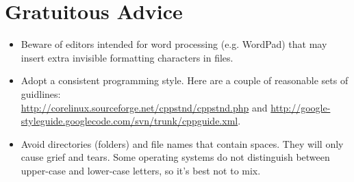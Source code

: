 \section{Gratuitous Advice}
\begin{itemize}
\item Beware of editors intended for word processing (e.g. WordPad)
that may insert extra invisible formatting characters in files.
\item Adopt a consistent programming style. Here are a couple of
reasonable sets of guidlines:\\
\url{http://corelinux.sourceforge.net/cppstnd/cppstnd.php}
and
\url{http://google-styleguide.googlecode.com/svn/trunk/cppguide.xml}.
\item Avoid directories (folders) and file names that contain
spaces. They will only cause grief and tears. Some operating systems do
not distinguish between upper-case and lower-case letters, so it's
best not to mix.
\end{itemize}



